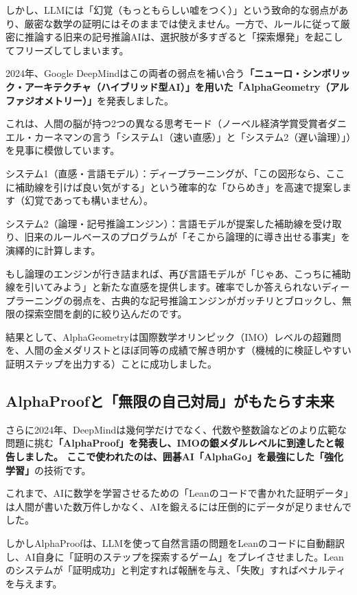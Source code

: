 しかし、LLMには「幻覚（もっともらしい嘘をつく）」という致命的な弱点があり、厳密な数学の証明にはそのままでは使えません。一方で、ルールに従って厳密に推論する旧来の記号推論AIは、選択肢が多すぎると「探索爆発」を起こしてフリーズしてしまいます。

2024年、Google DeepMindはこの両者の弱点を補い合う\textbf{「ニューロ・シンボリック・アーキテクチャ（ハイブリッド型AI）」を用いた「AlphaGeometry（アルファジオメトリー）」}を発表しました。

これは、人間の脳が持つ2つの異なる思考モード（ノーベル経済学賞受賞者ダニエル・カーネマンの言う「システム1（速い直感）」と「システム2（遅い論理）」）を見事に模倣しています。

システム1（直感・言語モデル）：ディープラーニングが、「この図形なら、ここに補助線を引けば良い気がする」という確率的な「ひらめき」を高速で提案します（幻覚であっても構いません）。

システム2（論理・記号推論エンジン）：言語モデルが提案した補助線を受け取り、旧来のルールベースのプログラムが「そこから論理的に導き出せる事実」を演繹的に計算します。

もし論理のエンジンが行き詰まれば、再び言語モデルが「じゃあ、こっちに補助線を引いてみよう」と新たな直感を提供します。確率でしか答えられないディープラーニングの弱点を、古典的な記号推論エンジンがガッチリとブロックし、無限の探索空間を劇的に絞り込んだのです。

結果として、AlphaGeometryは国際数学オリンピック（IMO）レベルの超難問を、人間の金メダリストとほぼ同等の成績で解き明かす（機械的に検証しやすい証明ステップを出力する）ことに成功しました。

\subsection{AlphaProofと「無限の自己対局」がもたらす未来}

さらに2024年、DeepMindは幾何学だけでなく、代数や整数論などのより広範な問題に挑む\textbf{「AlphaProof」を発表し、IMOの銀メダルレベルに到達したと報告しました。 ここで使われたのは、囲碁AI「AlphaGo」を最強にした「強化学習」}の技術です。

これまで、AIに数学を学習させるための「Leanのコードで書かれた証明データ」は人間が書いた数万件しかなく、AIを鍛えるには圧倒的にデータが足りませんでした。

しかしAlphaProofは、LLMを使って自然言語の問題をLeanのコードに自動翻訳し、AI自身に「証明のステップを探索するゲーム」をプレイさせました。Leanのシステムが「証明成功」と判定すれば報酬を与え、「失敗」すればペナルティを与えます。


